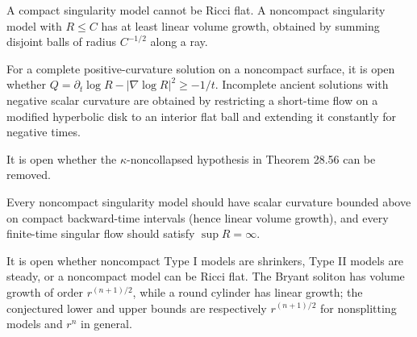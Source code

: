 \begin{remark}
\label{rem:chow-iv-linear-volume-growth}
A compact singularity model cannot be Ricci flat.  A noncompact singularity
model with \(R\le C\) has at least linear volume growth, obtained by summing
disjoint balls of radius \(C^{-1/2}\) along a ray.
\end{remark}

\begin{remark}
\label{rem:chow-iv-problem-28-3}
For a complete positive-curvature solution on a noncompact surface, it is
open whether \(Q=\partial_t\log R-|\nabla\log R|^2\ge-1/t\).  Incomplete
ancient solutions with negative scalar curvature are obtained by restricting
a short-time flow on a modified hyperbolic disk to an interior flat ball and
extending it constantly for negative times.
\end{remark}

\begin{remark}
\label{rem:chow-iv-remove-kappa-condition}
It is open whether the \(\kappa\)-noncollapsed hypothesis in Theorem 28.56
can be removed.
\end{remark}

\begin{remark}
\label{rem:chow-iv-singularity-conjectures}
Every noncompact singularity model should have scalar curvature bounded above
on compact backward-time intervals (hence linear volume growth), and every
finite-time singular flow should satisfy \(\sup R=\infty\).
\end{remark}

\begin{remark}
\label{rem:chow-iv-volume-growth-problems}
It is open whether noncompact Type I models are shrinkers, Type II models are
steady, or a noncompact model can be Ricci flat.  The Bryant soliton has volume
growth of order \(r^{(n+1)/2}\), while a round cylinder has linear growth;
the conjectured lower and upper bounds are respectively \(r^{(n+1)/2}\) for
nonsplitting models and \(r^n\) in general.
\end{remark}
